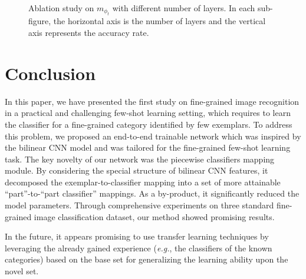 \documentclass[10pt,twocolumn,letterpaper]{article}
\begin{document}
\begin{figure}[t]
 \centering
 \quad

 \quad

 \quad
 \caption{Ablation study on $m_{{\phi}_t}$ with different number of layers. In each sub-figure, the horizontal axis is the number of layers and the vertical axis represents the accuracy rate.} \label{fig:numlayers}
\end{figure}

\section{Conclusion}\label{sec:conclude}

In this paper, we have presented the first study on fine-grained image recognition in a practical and challenging few-shot learning setting, which requires to learn the classifier for a fine-grained category identified by few exemplars. To address this problem, we proposed an end-to-end trainable network which was inspired by the bilinear CNN model and was tailored for the fine-grained few-shot learning task. The key novelty of our network was the piecewise classifiers mapping module. By considering the special structure of bilinear CNN features, it decomposed the exemplar-to-classifier mapping into a set of more attainable ``part''-to-``part classifier'' mappings. As a by-product, it significantly reduced the model parameters. Through comprehensive experiments on three standard fine-grained image classification dataset, our method showed promising results.

In the future, it appears promising to use transfer learning techniques by leveraging the already gained experience (\emph{e.g.}, the classifiers of the known categories) based on the base set for generalizing the learning ability upon the novel set.
\end{document}
